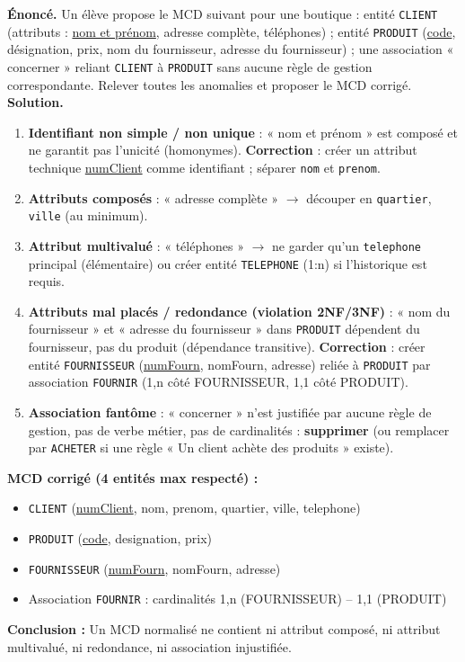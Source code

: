 \documentclass[11pt]{article}
\begin{document}
\begin{exoresolu}
\textbf{Énoncé.} Un élève propose le MCD suivant pour une boutique : entité \texttt{CLIENT} (attributs : \underline{nom et prénom}, adresse complète, téléphones) ; entité \texttt{PRODUIT} (\underline{code}, désignation, prix, nom du fournisseur, adresse du fournisseur) ; une association « concerner » reliant \texttt{CLIENT} à \texttt{PRODUIT} sans aucune règle de gestion correspondante. Relever toutes les anomalies et proposer le MCD corrigé.
\tcblower
\textbf{Solution.}
\begin{enumerate}
\item \textbf{Identifiant non simple / non unique} : « nom et prénom » est composé et ne garantit pas l'unicité (homonymes). \textbf{Correction} : créer un attribut technique \underline{numClient} comme identifiant ; séparer \texttt{nom} et \texttt{prenom}.
\item \textbf{Attributs composés} : « adresse complète » $\to$ découper en \texttt{quartier}, \texttt{ville} (au minimum).
\item \textbf{Attribut multivalué} : « téléphones » $\to$ ne garder qu'un \texttt{telephone} principal (élémentaire) ou créer entité \texttt{TELEPHONE} (1:n) si l'historique est requis.
\item \textbf{Attributs mal placés / redondance (violation 2NF/3NF)} : « nom du fournisseur » et « adresse du fournisseur » dans \texttt{PRODUIT} dépendent du fournisseur, pas du produit (dépendance transitive). \textbf{Correction} : créer entité \texttt{FOURNISSEUR} (\underline{numFourn}, nomFourn, adresse) reliée à \texttt{PRODUIT} par association \texttt{FOURNIR} (1,n côté FOURNISSEUR, 1,1 côté PRODUIT).
\item \textbf{Association fantôme} : « concerner » n'est justifiée par aucune règle de gestion, pas de verbe métier, pas de cardinalités : \textbf{supprimer} (ou remplacer par \texttt{ACHETER} si une règle « Un client achète des produits » existe).
\end{enumerate}
\textbf{MCD corrigé (4 entités max respecté) :}
\begin{itemize}
\item \texttt{CLIENT} (\underline{numClient}, nom, prenom, quartier, ville, telephone)
\item \texttt{PRODUIT} (\underline{code}, designation, prix)
\item \texttt{FOURNISSEUR} (\underline{numFourn}, nomFourn, adresse)
\item Association \texttt{FOURNIR} : cardinalités 1,n (FOURNISSEUR) -- 1,1 (PRODUIT)
\end{itemize}
\textbf{Conclusion :} Un MCD normalisé ne contient ni attribut composé, ni attribut multivalué, ni redondance, ni association injustifiée.
\end{exoresolu}
\end{document}
